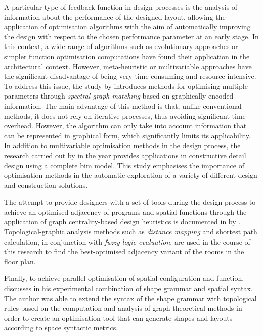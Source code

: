 \documentclass[a4paper, 12pt]{report}
\begin{document}
A particular type of feedback function in design processes is the analysis of information about the performance of the designed layout, allowing the application of optimisation algorithms with the aim of automatically improving the design with respect to the chosen performance parameter at an early stage. In this context, a wide range of algorithms such as evolutionary approaches or simpler function optimisation computations have found their application in the architectural context. However, meta-heuristic or multivariable approaches have the significant disadvantage of being very time consuming and resource intensive. To address this issue, the study  by \citeauthor{schaffranek2015parallel} introduces methods for optimising multiple parameters through \textit{spectral graph matching} based on graphically encoded information. The main advantage of this method is that, unlike conventional methods, it does not rely on iterative processes, thus avoiding significant time overhead. However, the algorithm can only take into account information that can be represented in graphical form, which significantly limits its applicability. In addition to multivariable optimisation methods in the design process, the research carried out by \citeauthor{canestrino2020generating} in the year \citeyear{canestrino2020generating} provides applications in constructive detail design using a complete \acrshort{bim} model. This study emphasises the importance of optimisation methods in the automatic exploration of a variety of different design and construction solutions.

The attempt to provide designers with a set of tools during the design process to achieve an optimised adjacency of programs and spatial functions through the application of graph \gls{centrality}-based design heuristics is documented in  by \citeauthor{fuchkina2022space}. Topological-graphic analysis methods such as \textit{distance mapping} and shortest path calculation, in conjunction with \textit{fuzzy logic evaluation}, are used in the course of this research to find the best-optimised adjacency variant of the rooms in the floor plan. 

Finally, to achieve parallel optimisation of spatial configuration and function, \citeauthor{muslimin2023experience} discusses in  his experimental combination of shape grammar and spatial syntax. The author was able to extend the syntax of the shape grammar with topological rules based on the computation and analysis of graph-theoretical methods in order to create an optimisation tool that can generate shapes and layouts according to space syntactic metrics.
\end{document}
